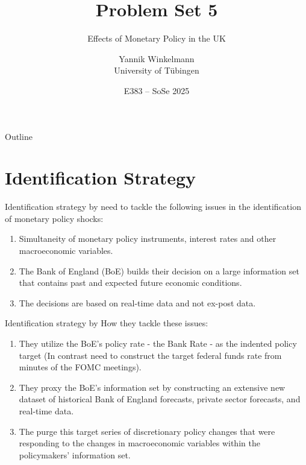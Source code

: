 \documentclass[aspectratio=169]{beamer}          %
\title[PS5]{Problem Set 5}
\subtitle{Effects of Monetary Policy in the UK}
\author[Yannik Winkelmann]{Yannik Winkelmann \\ University of Tübingen}
\date{E383 – SoSe 2025}
\begin{document}
\maketitle

\begin{frame}{Outline}
  \tableofcontents  %
\end{frame}

\section{Identification Strategy}

\begin{frame}{Identification strategy by \textcite{cloyneMacroeconomicEffectsMonetary2016}}
\textcite{cloyneMacroeconomicEffectsMonetary2016} need to tackle the following issues in the identification of monetary policy shocks:
\begin{enumerate}
    \item Simultaneity of monetary policy instruments, interest rates and other macroeconomic variables.
    \item The Bank of England (BoE) builds their decision on a large information set that contains past and expected future economic conditions.
    \item The decisions are based on real-time data and not ex-post data.
\end{enumerate}
\end{frame}

\begin{frame}{Identification strategy by \textcite{cloyneMacroeconomicEffectsMonetary2016}}
How they tackle these issues:
\begin{enumerate}
    \item They utilize the BoE's policy rate - the Bank Rate - as the indented policy target (In contrast \textcite{romer2004new} need to construct the target federal funds rate from minutes of the FOMC meetings). 
    \item They proxy the BoE's information set by constructing an extensive new dataset of historical Bank of England forecasts, private sector forecasts, and real-time data.
    \item The purge this target series of discretionary policy changes that were responding to the changes in macroeconomic variables within the policymakers’ information set.
    
\end{enumerate}
\end{frame}
\end{document}
